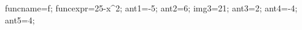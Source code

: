 \documentclass[exercice]{thedocument}%
\begin{document}
%
    \>funcname=f;%
    \>funcexpr=25-x^2;%
    \>ant1=-5;%
    \>ant2=6;%
    \>img3=21;%
    \>ant3=2;%
    \>ant4=-4;%
    \>ant5=4;%
\end{document}
